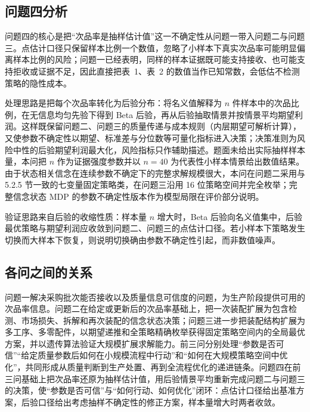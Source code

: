 \subsection{问题四分析}

问题四的核心是把“次品率是抽样估计值”这一不确定性从问题一带入问题二与问题三。点估计口径只保留样本比例一个数值，忽略了小样本下真实次品率可能明显偏离样本比例的风险；问题一已经表明，同样的样本证据既可能支持接收、也可能支持拒收或证据不足，因此直接把表~1、表~2 的数值当作已知常数，会低估不检测策略的隐性成本。

处理思路是把每个次品率转化为后验分布：将名义值解释为 $n$ 件样本中的次品比例，在无信息均匀先验下得到 Beta 后验，再从后验抽取情景并按情景平均期望利润。这样既保留问题二、问题三的质量传递与成本规则（内层期望可解析计算），又使参数不确定性以期望、标准差与分位数等可量化指标进入决策；决策准则为风险中性的后验期望利润最大化，风险指标只作辅助描述。题面未给出实际抽样样本量，本问把 $n$ 作为证据强度参数并以 $n=40$ 为代表性小样本情景给出数值结果。由于状态相关信念在连续参数不确定下的完整求解规模很大，本问在问题二采用与 5.2.5 节一致的七变量固定策略类，在问题三沿用 16 位策略空间并完全枚举；完整信念状态 MDP 的参数不确定性版本作为模型局限在评价部分说明。

验证思路来自后验的收缩性质：样本量 $n$ 增大时，Beta 后验向名义值集中，后验最优策略与期望利润应收敛到问题二、问题三的点估计口径。若小样本下策略发生切换而大样本下恢复，则说明切换确由参数不确定性引起，而非数值噪声。

\subsection{各问之间的关系}

问题一解决采购批次能否接收以及质量信息可信度的问题，为生产阶段提供可用的次品率信息。问题二在给定或更新后的次品率基础上，把一次装配扩展为包含检测、市场损失、拆解和再次装配的信念状态决策；问题三进一步把装配结构扩展为多工序、多零配件，以期望递推和全策略精确枚举获得固定策略空间内的全局最优方案，并以遗传算法验证大规模扩展求解能力。前三问分别处理“参数是否可信”“给定质量参数后如何在小规模流程中行动”和“如何在大规模策略空间中优化”，共同形成从质量判断到生产处置、再到全流程优化的递进链条。问题四在前三问基础上把次品率还原为抽样估计值，用后验情景平均重新完成问题二与问题三的决策，使“参数是否可信”与“如何行动、如何优化”闭环：点估计口径给出基准方案，后验口径给出考虑抽样不确定性的修正方案，样本量增大时两者收敛。

